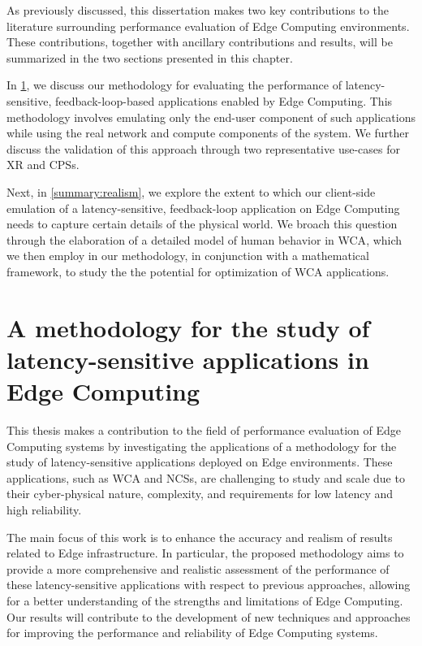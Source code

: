 As previously discussed, this dissertation makes two key contributions to the literature surrounding performance evaluation of Edge Computing environments.
These contributions, together with ancillary contributions and results, will be summarized in the two sections presented in this chapter.

In \cref{summary:methodology}, we discuss our methodology for evaluating the performance of latency-sensitive, feedback-loop-based applications enabled by Edge Computing.
This methodology involves emulating only the end-user component of such applications while using the real network and compute components of the system. 
We further discuss the validation of this approach through two representative use-cases for \gls{XR} and \glspl{CPS}.

Next, in \cref{summary:realism}, we explore the extent to which our client-side emulation of a latency-sensitive, feedback-loop application on Edge Computing needs to capture certain details of the physical world.
We broach this question through the elaboration of a detailed model of human behavior in \gls{WCA}, which we then employ in our methodology, in conjunction with a mathematical framework, to study the the potential for optimization of \gls{WCA} applications.

\section{A methodology for the study of latency-sensitive applications in Edge Computing}\label{summary:methodology}

This thesis makes a contribution to the field of performance evaluation of Edge Computing systems by investigating the applications of a methodology for the study of latency-sensitive applications deployed on Edge environments.
These applications, such as \gls{WCA} and \glspl{NCS}, are challenging to study and scale due to their cyber-physical nature, complexity, and requirements for low latency and high reliability.

The main focus of this work is to enhance the accuracy and realism of results related to Edge infrastructure.
In particular, the proposed methodology aims to provide a more comprehensive and realistic assessment of the performance of these latency-sensitive applications with respect to previous approaches, allowing for a better understanding of the strengths and limitations of Edge Computing.
Our results will contribute to the development of new techniques and approaches for improving the performance and reliability of Edge Computing systems.

